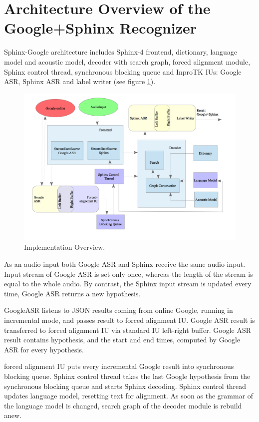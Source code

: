 \section {Architecture Overview of the Google+Sphinx Recognizer}
Sphinx-Google architecture includes Sphinx-4 frontend, dictionary,
language model and acoustic model, decoder with search graph, forced alignment
module, Sphinx control thread, synchronous blocking queue and InproTK IUs:
Google ASR, Sphinx ASR and label writer (see figure \ref {fig:arch}).
\begin{figure}[htbp]
  \centering
    \includegraphics[width=1\textwidth]{images/architecture.png}
 \caption{Implementation Overview.}
  \label{fig:arch}
\end {figure} 

As an audio input both Google ASR and Sphinx receive the same audio input.
Input stream of Google ASR is set only once, whereas the length of
the stream is equal to the whole audio. By contrast, the Sphinx input stream is
updated every time, Google ASR returns a new hypothesis.  


GoogleASR listens to JSON results coming from online Google, running
in incremental mode, and passes result to forced alignment IU. Google ASR result
is transferred to forced alignment IU via standard IU left-right buffer. Google
ASR result contains hypothesis, and the start and end times, computed by Google
ASR for every hypothesis. 

forced alignment IU puts every incremental Google result into synchronous
blocking queue. Sphinx control thread takes the last Google hypothesis from the
synchronous blocking queue and starts Sphinx decoding. Sphinx control thread
updates language model, resetting text for alignment. As soon as the grammar of
the language model is changed, search graph of the decoder module is rebuild
anew. 


